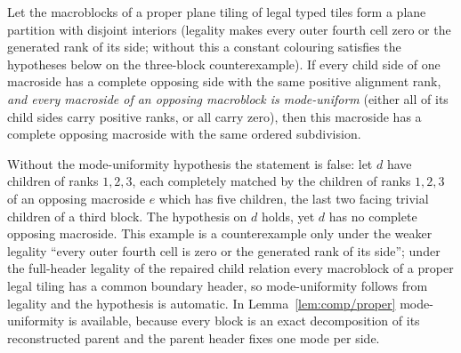\begin{lemma}
\label{lem:comp/alignment}
Let the macroblocks of a proper plane tiling of legal typed tiles form a
plane partition with disjoint interiors (legality makes every outer fourth
cell zero or the generated rank of its side; without this a constant
colouring satisfies the hypotheses below on the three-block counterexample).
If every child side of one macroside has a complete opposing side with the
same positive alignment rank, \emph{and every macroside of an opposing
macroblock is mode-uniform} (either all of its child sides carry positive
ranks, or all carry zero), then this macroside has a complete opposing
macroside with the same ordered subdivision.

Without the mode-uniformity hypothesis the statement is false: let $d$
have children of ranks $1,2,3$, each completely matched by the children of
ranks $1,2,3$ of an opposing macroside $e$ which has five children, the
last two facing trivial children of a third block. The hypothesis on $d$
holds, yet $d$ has no complete opposing macroside. This example is a
counterexample only under the weaker legality ``every outer fourth cell is
zero or the generated rank of its side''; under the full-header legality of
the repaired child relation every macroblock of a proper legal tiling has a
common boundary header, so mode-uniformity follows from legality and the
hypothesis is automatic. In
Lemma~\ref{lem:comp/proper} mode-uniformity is available, because every
block is an exact decomposition of its reconstructed parent and the parent
header fixes one mode per side.
\end{lemma}
